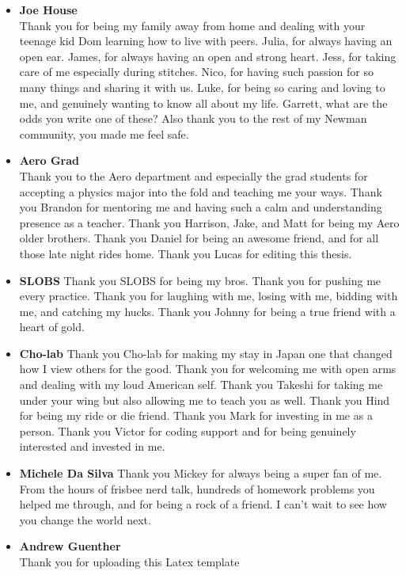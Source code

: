 \begin{itemize}
    \item \textbf{Joe House}\\
    Thank you for being my family away from home and dealing with your teenage kid Dom learning how to live with peers. Julia, for always having an open ear. James, for always having an open and strong heart. Jess, for taking care of me especially during stitches. Nico, for having such passion for so many things and sharing it with us. Luke, for being so caring and loving to me, and genuinely wanting to know all about my life. Garrett, what are the odds you write one of these? Also thank you to the rest of my Newman community, you made me feel safe.
    \item \textbf{Aero Grad}\\
    Thank you to the Aero department and especially the grad students for accepting a physics major into the fold and teaching me your ways. Thank you Brandon for mentoring me and having such a calm and understanding presence as a teacher. Thank you Harrison, Jake, and Matt for being my Aero older brothers. Thank you Daniel for being an awesome friend, and for all those late night rides home. Thank you Lucas for editing this thesis.
    \item \textbf{SLOBS}
    Thank you SLOBS for being my bros. Thank you for pushing me every practice. Thank you for laughing with me, losing with me, bidding with me, and catching my hucks. Thank you Johnny for being a true friend with a heart of gold.
    \item \textbf{Cho-lab}
    Thank you Cho-lab for making my stay in Japan one that changed how I view others for the good. Thank you for welcoming me with open arms and dealing with my loud American self. Thank you Takeshi for taking me under your wing but also allowing me to teach you as well. Thank you Hind for being my ride or die friend. Thank you Mark for investing in me as a person. Thank you Victor for coding support and for being genuinely interested and invested in me.
    \item \textbf{Michele Da Silva}
    Thank you Mickey for always being a super fan of me. From the hours of frisbee nerd talk, hundreds of homework problems you helped me through, and for being a rock of a friend. I can't wait to see how you change the world next. 
    \item \textbf{Andrew Guenther}\\
    Thank you for uploading this Latex template
\end{itemize}
